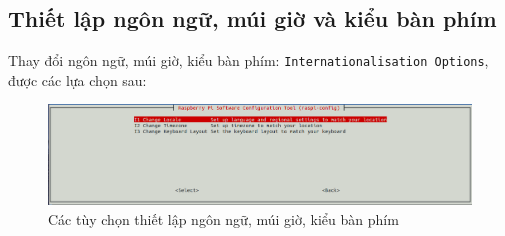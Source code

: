 \subsection{Thiết lập ngôn ngữ, múi giờ và kiểu bàn phím}
Thay đổi ngôn ngữ, múi giờ, kiểu bàn phím: \verb|Internationalisation Options|, được các lựa chọn sau:
\begin{figure}[!h]
\begin{center}
\includegraphics[scale=.35]{setup-os/images/Time}
\end{center}
\caption{Các tùy chọn thiết lập ngôn ngữ, múi giờ, kiểu bàn phím}
\end{figure}
